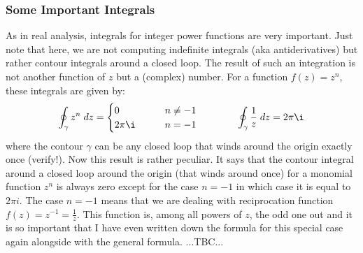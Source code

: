 \subsubsection{Some Important Integrals}
As in real analysis, integrals for integer power functions are very important. Just note that here, we are not computing indefinite integrals (aka antiderivatives) but rather contour integrals around a closed loop. The result of such an integration is not another function of $z$ but a (complex) number. For a function $f(z) = z^n$, these integrals are given by:
\begin{equation}
\oint_{\gamma} z^n \; dz = 
\begin{cases}
0        \qquad & n \neq -1 \\
2 \pi \i \qquad & n = -1
\end{cases}
\qquad \qquad
\oint_{\gamma} \frac{1}{z} \; dz = 2 \pi \i
\end{equation}
where the contour $\gamma$ can be any closed loop that winds around the origin exactly once (verify!). Now this result is rather peculiar. It says that the contour integral around a closed loop around the origin (that winds around once) for a monomial function $z^n$ is always zero except for the case $n=-1$ in which case it is equal to $2 \pi i$. The case $n=-1$ means that we are dealing with reciprocation function $f(z) = z^{-1} = \frac{1}{z}$. This function is, among all powers of $z$, the odd one out and it is so important that I have even written down the formula for this special case again alongside with the general formula. ...TBC...




